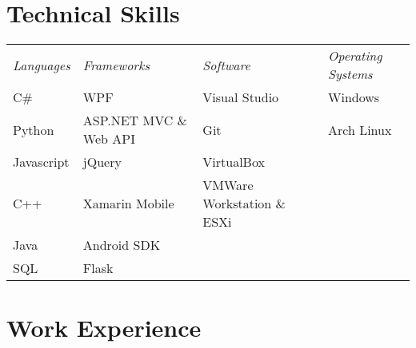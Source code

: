 \documentclass[a4paper,10pt]{article} %
\begin{document}
\section{Technical Skills}

\begin{tabular}{l|l|l|l}
\textit{Languages} & \textit{Frameworks} & \textit{Software} & \textit{Operating Systems} \\
C\# & WPF & Visual Studio & Windows \\
Python & ASP.NET MVC \& Web API & Git & Arch Linux \\
Javascript & jQuery & VirtualBox & \\
C++ & Xamarin Mobile & VMWare Workstation \& ESXi & \\
Java & Android SDK & & \\
SQL & Flask & & \\
\end{tabular}

\section{Work Experience}
\end{document}
